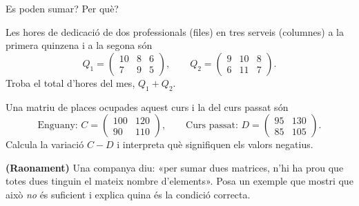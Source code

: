 \begin{exercicis}
\begin{exlist}
        Es poden sumar? Per què?
  \item Les hores de dedicació de dos professionals (files) en tres serveis
        (columnes) a la primera quinzena i a la segona són
        \[ Q_1=\begin{pmatrix} 10 & 8 & 6 \\ 7 & 9 & 5 \end{pmatrix},\qquad
           Q_2=\begin{pmatrix} 9 & 10 & 8 \\ 6 & 11 & 7 \end{pmatrix}. \]
        Troba el total d'hores del mes, $Q_1+Q_2$.
  \item Una matriu de places ocupades aquest curs i la del curs passat són
        \[ \text{Enguany: } C=\begin{pmatrix} 100 & 120 \\ 90 & 110 \end{pmatrix},\qquad
           \text{Curs passat: } D=\begin{pmatrix} 95 & 130 \\ 85 & 105 \end{pmatrix}. \]
        Calcula la variació $C-D$ i interpreta què signifiquen els valors negatius.
  \item \textbf{(Raonament)} Una companya diu: «per sumar dues matrices, n'hi ha
        prou que totes dues tinguin el mateix nombre d'elements». Posa un exemple
        que mostri que això \emph{no} és suficient i explica quina és la condició
        correcta.
\end{exlist}
\end{exercicis}

